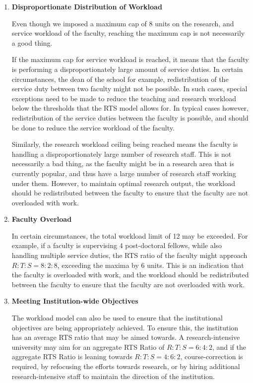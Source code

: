 \begin{enumerate}
  \item \textbf{Disproportionate Distribution of Workload}

        Even though we imposed a maximum cap of 8 units on the research, and service workload of the faculty, reaching the maximum cap is not necessarily a good thing.

        If the maximum cap for service workload is reached, it means that the faculty is performing a disproportionately large amount of service duties. In certain circumstances, the dean of the school for example, redistribution of the service duty between two faculty might not be possible. In such cases, special exceptions need to be made to reduce the teaching and research workload below the thresholds that the RTS model allows for. In typical cases however, redistribution of the service duties between the faculty is possible, and should be done to reduce the service workload of the faculty.

        Similarly, the research workload ceiling being reached means the faculty is handling a disproportionately large number of research staff. This is not necessarily a bad thing, as the faculty might be in a research area that is currently popular, and thus have a large number of research staff working under them. However, to maintain optimal research output, the workload should be redistributed between the faculty to ensure that the faculty are not overloaded with work.

  \item \textbf{Faculty Overload}

        In certain circumstances, the total workload limit of 12 may be exceeded. For example, if a faculty is supervising 4 post-doctoral fellows, while also handling multiple service duties, the RTS ratio of the faculty might approach $R:T:S = 8:2:8$, exceeding the maxima by 6 units. This is an indication that the faculty is overloaded with work, and the workload should be redistributed between the faculty to ensure that the faculty are not overloaded with work.

  \item \textbf{Meeting Institution-wide Objectives}

        The workload model can also be used to ensure that the institutional objectives are being appropriately achieved. To ensure this, the institution has an average RTS ratio that may be aimed towards. A research-intensive university may aim for an aggregate RTS Ratio of $R:T:S = 6:4:2$, and if the aggregate RTS Ratio is leaning towards $R:T:S = 4:6:2$, course-correction is required, by refocusing the efforts towards research, or by hiring additional research-intensive staff to maintain the direction of the institution.
\end{enumerate}
